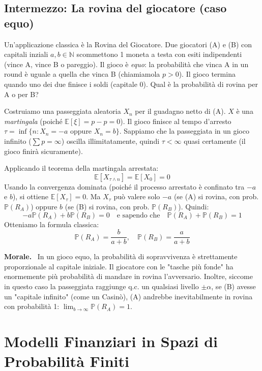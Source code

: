 \documentclass[11pt, a4paper]{report}
\theoremstyle{plain}
\theoremstyle{definition}
\theoremstyle{remark}
\newenvironment{hint}[1][Hint]
{\begin{mdframed}[backgroundcolor=blue!5, linecolor=blue!50, linewidth=2pt, topline=false, rightline=false, bottomline=false]
\textbf{\textsf{#1.}}\ }
{\end{mdframed}}
\newcommand{\PP}{\mathbb{P}}
\newcommand{\E}{\mathbb{E}}
\newcommand{\N}{\mathbb{N}}
\newcommand{\1}{\mathbf{1}}
\begin{document}
\section{Intermezzo: La rovina del giocatore (caso equo)}

Un'applicazione classica è la Rovina del Giocatore. 
Due giocatori (A) e (B) con capitali inziali $a, b \in \N$ scommettono 1 moneta a testa con esiti indipendenti (vince A, vince B o pareggio). Il gioco è \emph{equo}: la probabilità che vinca A in un round è uguale a quella che vinca B (chiamiamola $p > 0$).
Il gioco termina quando uno dei due finisce i soldi (capitale 0). Qual è la probabilità di rovina per A o per B?

Costruiamo una passeggiata aleatoria $X_n$ per il guadagno netto di (A). $X$ è una \emph{martingala} (poiché $\E[\xi] = p - p = 0$). Il gioco finisce al tempo d'arresto $\tau = \inf\{n : X_n = -a \text{ oppure } X_n = b\}$.
Sappiamo che la passeggiata in un gioco infinito ($\sum p = \infty$) oscilla illimitatamente, quindi $\tau < \infty$ quasi certamente (il gioco finirà sicuramente).

Applicando il teorema della martingala arrestata:
\[ \E[X_{\tau \wedge n}] = \E[X_0] = 0 \]
Usando la convergenza dominata (poiché il processo arrestato è confinato tra $-a$ e $b$), si ottiene $\E[X_\tau] = 0$.
Ma $X_\tau$ può valere solo $-a$ (se (A) si rovina, con prob. $\PP(R_A)$) oppure $b$ (se (B) si rovina, con prob. $\PP(R_B)$).
Quindi:
\[ -a \PP(R_A) + b \PP(R_B) = 0 \quad \text{e sapendo che} \quad \PP(R_A) + \PP(R_B) = 1 \]
Otteniamo la formula classica:
\[ \PP(R_A) = \frac{b}{a+b}, \quad \PP(R_B) = \frac{a}{a+b} \]

\begin{hint}[Morale]
In un gioco equo, la probabilità di sopravvivenza è strettamente proporzionale al capitale iniziale. Il giocatore con le "tasche più fonde" ha enormemente più probabilità di mandare in rovina l'avversario.
Inoltre, siccome in questo caso la passeggiata raggiunge q.c. un qualsiasi livello $\pm \alpha$, se (B) avesse un "capitale infinito" (come un Casinò), (A) andrebbe inevitabilmente in rovina con probabilità 1: $\lim_{b \to \infty} \PP(R_A) = 1$.
\end{hint}



\chapter{Modelli Finanziari in Spazi di Probabilità Finiti}
\end{document}

